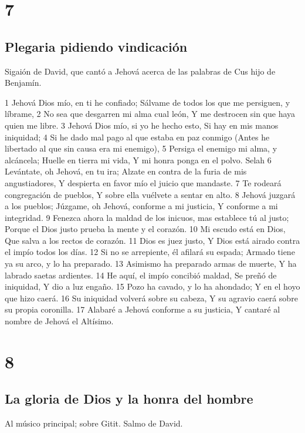 \chapter{7}

\section*{Plegaria pidiendo vindicación}

Sigaión de David, que cantó a Jehová acerca de las palabras de Cus hijo de Benjamín.

1 Jehová Dios mío, en ti he confiado;
Sálvame de todos los que me persiguen, y líbrame,
2 No sea que desgarren mi alma cual león,
Y me destrocen sin que haya quien me libre.
3 Jehová Dios mío, si yo he hecho esto,
Si hay en mis manos iniquidad;
4 Si he dado mal pago al que estaba en paz conmigo
(Antes he libertado al que sin causa era mi enemigo),
5 Persiga el enemigo mi alma, y alcáncela;
Huelle en tierra mi vida,
Y mi honra ponga en el polvo. Selah
6 Levántate, oh Jehová, en tu ira;
Alzate en contra de la furia de mis angustiadores,
Y despierta en favor mío el juicio que mandaste.
7 Te rodeará congregación de pueblos,
Y sobre ella vuélvete a sentar en alto.
8 Jehová juzgará a los pueblos;
Júzgame, oh Jehová, conforme a mi justicia,
Y conforme a mi integridad.
9 Fenezca ahora la maldad de los inicuos, mas establece tú al justo;
Porque el Dios justo prueba la mente y el corazón.
10 Mi escudo está en Dios,
Que salva a los rectos de corazón.
11 Dios es juez justo,
Y Dios está airado contra el impío todos los días.
12 Si no se arrepiente, él afilará su espada;
Armado tiene ya su arco, y lo ha preparado.
13 Asimismo ha preparado armas de muerte,
Y ha labrado saetas ardientes.
14 He aquí, el impío concibió maldad,
Se preñó de iniquidad,
Y dio a luz engaño.
15 Pozo ha cavado, y lo ha ahondado;
Y en el hoyo que hizo caerá.
16 Su iniquidad volverá sobre su cabeza,
Y su agravio caerá sobre su propia coronilla.
17 Alabaré a Jehová conforme a su justicia,
Y cantaré al nombre de Jehová el Altísimo.

\chapter{8}

\section*{La gloria de Dios y la honra del hombre}

Al músico principal; sobre Gitit. Salmo de David.


